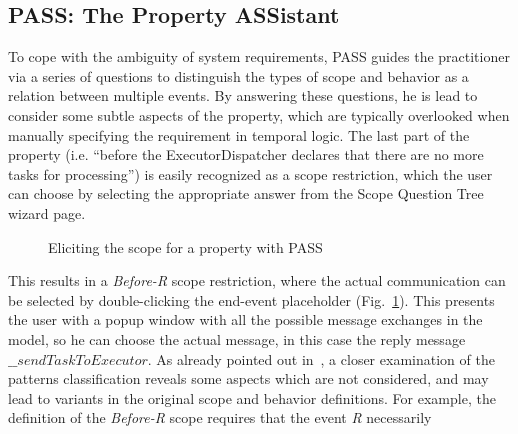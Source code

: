 \documentclass[letter]{llncs}
\begin{document}
\subsection{PASS: The Property ASSistant} 
\vspace{-6 pt}
To cope with the ambiguity of system requirements, PASS 
guides the practitioner via a series of questions to distinguish the types of scope and 
behavior as a relation between multiple events. By answering these questions, 
he is lead to consider some subtle aspects of the property, which are typically 
overlooked when manually specifying the requirement in temporal logic.
The last part of the property (i.e. ``before the ExecutorDispatcher
declares that there are no more tasks for processing'') is easily recognized as a scope restriction,
which the user can choose by selecting the appropriate answer from the Scope Question Tree wizard page.
\begin{figure}[!b]
\centering
{%
\setlength{\fboxsep}{1.5pt}%
\setlength{\fboxrule}{0.5pt}%
%
}%
\caption{Eliciting the scope for a property with PASS}
\label{fig:ScopePASS}
\end{figure}
This results in a \emph{Before-R} scope restriction, where the actual communication can be selected by double-clicking the end-event placeholder (Fig.~\ref{fig:ScopePASS}).
This presents the user with a popup window with all the possible message exchanges in the model, so he can choose the actual message, in this case
the reply message $\_\_sendTaskToExecutor$.
As already pointed out in~\cite{Smith02propel:an}, a closer examination of the patterns classification reveals some aspects
which are not considered, and may lead to variants in the original scope and behavior definitions. 
For example, the definition of the \emph{Before-R} scope requires that the event \emph{R} necessarily
\end{document}
